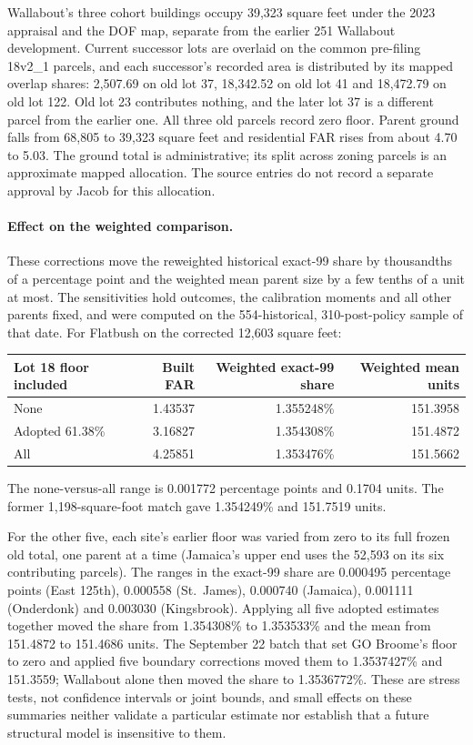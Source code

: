 Wallabout's three cohort buildings occupy 39,323 square feet under the 2023
appraisal and the DOF map, separate from the earlier 251 Wallabout
development. Current successor lots are overlaid on the common pre-filing
18v2\_1 parcels, and each successor's recorded area is distributed by its
mapped overlap shares: 2,507.69 on old lot 37, 18,342.52 on old lot 41 and
18,472.79 on old lot 122. Old lot 23 contributes nothing, and the later lot
37 is a different parcel from the earlier one. All three old parcels record
zero floor. Parent ground falls from 68,805 to 39,323 square feet and
residential FAR rises from about 4.70 to 5.03. The ground total is
administrative; its split across zoning parcels is an approximate mapped
allocation. The source entries do not record a separate approval by Jacob for
this allocation.

\paragraph{Effect on the weighted comparison.}
These corrections move the reweighted historical exact-99 share by thousandths
of a percentage point and the weighted mean parent size by a few tenths of a
unit at most. The sensitivities hold outcomes, the calibration moments
and all other parents fixed, and were computed on the 554-historical,
310-post-policy sample of that date. For Flatbush on the corrected 12,603
square feet:

\begin{center}
\small
\begin{tabular}{lrrr}
\hline
Lot 18 floor included & Built FAR & Weighted exact-99 share & Weighted mean units \\
\hline
None & 1.43537 & 1.355248\% & 151.3958 \\
Adopted 61.38\% & 3.16827 & 1.354308\% & 151.4872 \\
All & 4.25851 & 1.353476\% & 151.5662 \\
\hline
\end{tabular}
\end{center}
\noindent The none-versus-all range is 0.001772 percentage points and 0.1704
units. The former 1,198-square-foot match gave 1.354249\% and 151.7519 units.

For the other five, each site's earlier floor was varied from zero to its full
frozen old total, one parent at a time (Jamaica's upper end uses the 52,593 on
its six contributing parcels). The ranges in the exact-99 share are 0.000495
percentage points (East 125th), 0.000558 (St.~James), 0.000740 (Jamaica),
0.001111 (Onderdonk) and 0.003030 (Kingsbrook). Applying all five adopted
estimates together moved the share from 1.354308\% to 1.353533\% and the mean
from 151.4872 to 151.4686 units. The September 22 batch that set GO Broome's
floor to zero and applied five boundary corrections moved them to 1.3537427\%
and 151.3559; Wallabout alone then moved the share to 1.3536772\%. These are
stress tests, not confidence intervals or joint bounds, and small effects on
these summaries neither validate a particular estimate nor establish that a
future structural model is insensitive to them.

